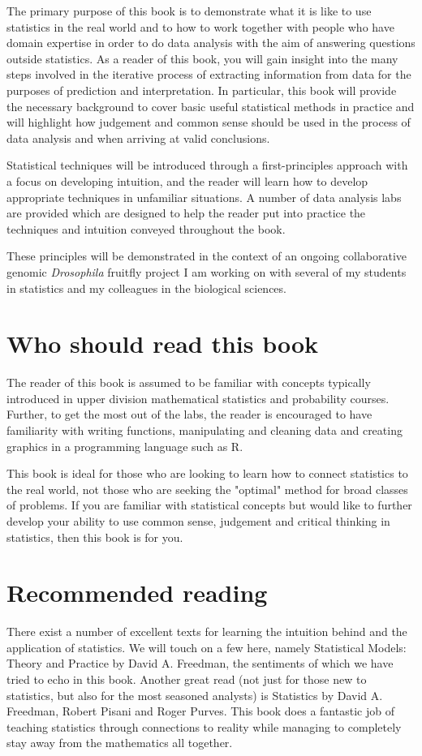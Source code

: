 The primary purpose of this book is to demonstrate what it is like to use statistics in the real world and to how to work together with people who have domain expertise in order to do data analysis with the aim of answering questions outside statistics. As a reader of this book, you will gain insight into the many steps involved in the iterative process of extracting information from data for the purposes of prediction and interpretation. In particular, this book will provide the necessary background to cover basic useful statistical methods in practice and will highlight how judgement and common sense should be used in the process of data analysis and when arriving at valid conclusions. 

Statistical techniques will be introduced through a first-principles approach with a focus on developing intuition, and the reader will learn how to develop appropriate techniques in unfamiliar situations. A number of data analysis labs are provided which are designed to help the reader put into practice the techniques and intuition conveyed throughout the book.

These principles will be demonstrated in the context of an ongoing collaborative genomic \emph{Drosophila} fruitfly project I am working on with several of my students in statistics and my colleagues in the biological sciences. 

\section*{Who should read this book}

The reader of this book is assumed to be familiar with concepts typically introduced in upper division mathematical statistics and probability courses. Further, to get the most out of the labs, the reader is encouraged to have familiarity with writing functions, manipulating and cleaning data and creating graphics in a programming language such as R.

This book is ideal for those who are looking to learn how to connect statistics to the real world, not those who are seeking the "optimal" method for broad classes of problems. If you are familiar with statistical concepts but would like to further develop your ability to use common sense, judgement and critical thinking in statistics, then this book is for you.


\section*{Recommended reading}

There exist a number of excellent texts for learning the intuition behind and the application of statistics. We will touch on a few here, namely Statistical Models: Theory and Practice by David A. Freedman, the sentiments of which we have tried to echo in this book. Another great read (not just for those new to statistics, but also for the most seasoned analysts) is Statistics by David A. Freedman, Robert Pisani and Roger Purves. This book does a fantastic job of teaching statistics through connections to reality while managing to completely stay away from the mathematics all together.